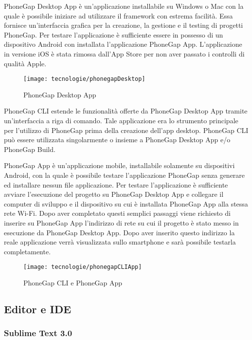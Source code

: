 PhoneGap Desktop App è un'applicazione installabile su Windows o Mac con la quale è possibile iniziare ad utilizzare il framework con estrema facilità. Essa fornisce un'interfaccia grafica per la creazione, la gestione e il testing di progetti PhoneGap. Per testare l'applicazione è sufficiente essere in possesso di un dispositivo Android con installata l'applicazione PhoneGap App. L'applicazione in versione iOS è stata rimossa dall'App Store per non aver passato i controlli di qualità Apple.

\begin{figure}[!h] 
    \centering 
    \texttt{[image: tecnologie/phonegapDesktop]} 
    \caption{PhoneGap Desktop App}
\end{figure}

PhoneGap CLI estende le funzionalità offerte da PhoneGap Desktop App tramite un'interfaccia a riga di comando. Tale applicazione era lo strumento principale per l'utilizzo di PhoneGap prima della creazione dell'app desktop. PhoneGap CLI può essere utilizzata singolarmente o insieme a PhoneGap Desktop App e/o PhoneGap Build.

PhoneGap App è un'applicazione mobile, installabile solamente su dispositivi Android, con la quale è possibile testare l'applicazione PhoneGap senza generare ed installare nessun file applicazione. Per testare l'applicazione è sufficiente avviare l'esecuzione del progetto su PhoneGap Desktop App e collegare il computer di sviluppo e il dispositivo su cui è installata PhoneGap App alla stessa rete Wi-Fi. Dopo aver completato questi semplici passaggi viene richiesto di inserire su PhoneGap App l'indirizzo di rete su cui il progetto è stato messo in esecuzione da PhoneGap Desktop App. Dopo aver inserito questo indirizzo la reale applicazione verrà visualizzata sullo smartphone e sarà possibile testarla completamente.

\begin{figure}[!h] 
    \centering 
    \texttt{[image: tecnologie/phonegapCLIApp]} 
    \caption{PhoneGap CLI e PhoneGap App}
\end{figure}

\subsection{Editor e IDE}

\subsubsection{Sublime Text 3.0}

